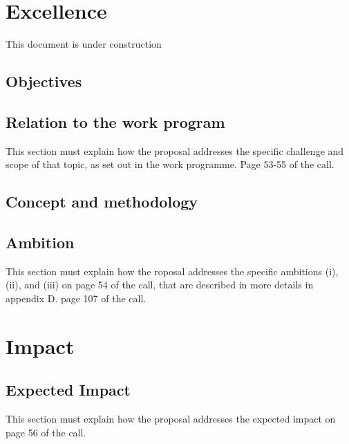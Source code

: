 \documentclass[12pt]{book}
\begin{document}
\tableofcontents
\chapter{Excellence}
{\Huge \color{red} This document is under construction}



\section{Objectives}



\section{Relation to the work program}

{\color{red} This section must explain how the proposal addresses the
  specific challenge and scope of that topic, as set out in the work
  programme. Page 53-55 of the call.}



\section{Concept and methodology}



\section{Ambition}

{\color{red} This section must explain how the roposal addresses the
  specific ambitions (i), (ii), and (iii) on page 54 of the call, that are
  described in more details in appendix D. page 107 of the call.}



\chapter{Impact}

\section{Expected Impact}

{\color{red} This section must explain how the proposal addresses the
  expected impact on page 56 of the call.}


\end{document}
